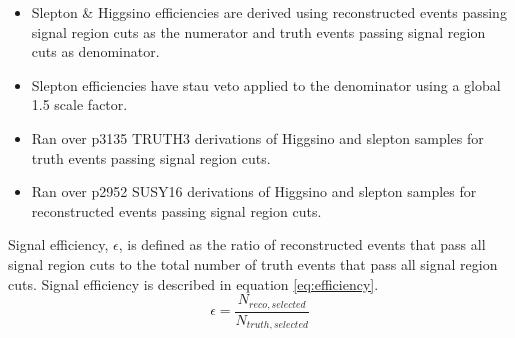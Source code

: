 \begin{itemize}
\item Slepton \& Higgsino efficiencies are derived using reconstructed events passing signal region cuts as the numerator and truth events passing signal region cuts as denominator.
\item Slepton efficiencies have stau veto applied to the denominator using a global 1.5 scale factor.
\item Ran over p3135 TRUTH3 derivations of Higgsino and slepton samples for truth events passing signal region cuts.
\item Ran over p2952 SUSY16 derivations of Higgsino and slepton samples for reconstructed events passing signal region cuts.
\end{itemize}

Signal efficiency, $\epsilon$, is defined as the ratio of reconstructed events that pass all signal region cuts to the total number of truth events that pass all signal region cuts.  Signal efficiency is described in equation \ref{eq:efficiency}.\\
\begin{equation}
\epsilon = \frac{N_{reco,selected}}{N_{truth,selected}}
\label{eq:efficiency}
\end{equation}
\FloatBarrier

